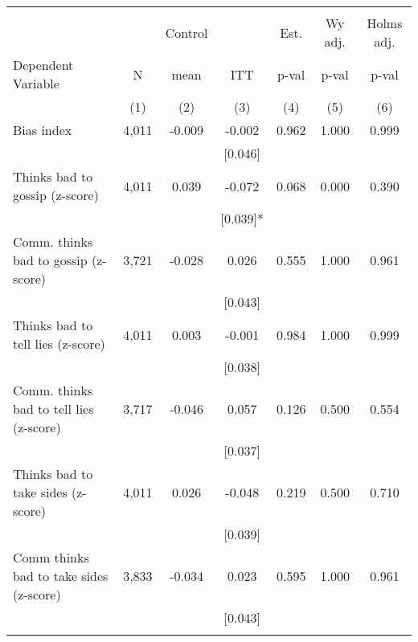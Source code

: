 \begin{tabular}{lcccccc}
\hline \noalign{\smallskip} &  &  &  &  &  & \\
 &  & Control &  & Est. & Wy adj. & Holms adj.\\
Dependent Variable & N & mean & ITT & p-val & p-val & p-val\\
 & (1) & (2) & (3) & (4) & (5) & (6)\\
\noalign{\smallskip}\hline \noalign{\smallskip}\quad Bias index & 4,011 & -0.009 & -0.002 & 0.962 & 1.000 & 0.999\\
 &  &  & [0.046] &  &  & \\
\quad Thinks bad to gossip (z-score) & 4,011 & 0.039 & -0.072 & 0.068 & 0.000 & 0.390\\
 &  &  & [0.039]* &  &  & \\
\quad Comm. thinks bad to gossip (z-score) & 3,721 & -0.028 & 0.026 & 0.555 & 1.000 & 0.961\\
 &  &  & [0.043] &  &  & \\
\quad Thinks bad to tell lies (z-score) & 4,011 & 0.003 & -0.001 & 0.984 & 1.000 & 0.999\\
 &  &  & [0.038] &  &  & \\
\quad Comm. thinks bad to tell lies (z-score) & 3,717 & -0.046 & 0.057 & 0.126 & 0.500 & 0.554\\
 &  &  & [0.037] &  &  & \\
\quad Thinks bad to take sides (z-score) & 4,011 & 0.026 & -0.048 & 0.219 & 0.500 & 0.710\\
 &  &  & [0.039] &  &  & \\
\quad Comm thinks bad to take sides (z-score) & 3,833 & -0.034 & 0.023 & 0.595 & 1.000 & 0.961\\
 &  &  & [0.043] &  &  & \\
\noalign{\smallskip}\hline\end{tabular}
